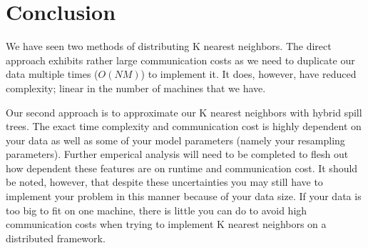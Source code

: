\section{Conclusion}

\vspace{5 mm}
\noindent
We have seen two methods of distributing K nearest neighbors. The direct 
approach exhibits rather large communication costs as we need to duplicate our 
data multiple times ($O(N M)$) to implement it. It does, however, have 
reduced complexity; linear in the number of machines that we have. 

\newpage

\vspace{5 mm}
\noindent
Our second approach is to approximate our K nearest neighbors with hybrid spill 
trees. The exact time complexity and communication cost is highly dependent on 
your data as well as some of your model parameters (namely your resampling 
parameters). Further emperical analysis will need to be completed to flesh out 
how dependent these features are on runtime and communication cost. It should 
be noted, however, that despite these uncertainties you may still have to 
implement your problem in this manner because of your data size. If your data 
is too big to fit on one machine, there is little you can do to avoid high 
communication costs when trying to implement K nearest neighbors on a 
distributed framework.
